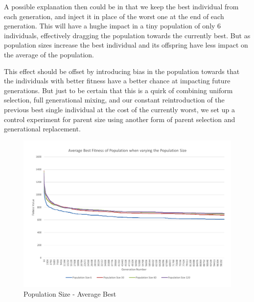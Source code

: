 A possible explanation then could be in that we keep the best individual from each generation, and inject it in place of the worst one at the end of each generation. This will have a hughe impact in a tiny population of only 6 individuals, effectively dragging the population towards the currently best. But as population sizes increase the best individual and its offspring have less impact on the average of the population.

This effect should be offset by introducing bias in the population towards that the individuals with better fitness have a better chance at impacting future generations. But just to be certain that this is a quirk of combining uniform selection, full generational mixing, and our constant reintroduction of the previous best single individual at the cost of the currently worst, we set up a control experiment for parent size using another form of parent selection and generational replacement.

\begin{figure}[thbp]
	\centerline{\includegraphics[width=\paperwidth]{figures/CircleTests/PopulationSize/CircleTestsPopulationAverageBest.pdf}}
	\caption{Population Size - Average Best}
	\label{fig:ctpab}
\end{figure}


